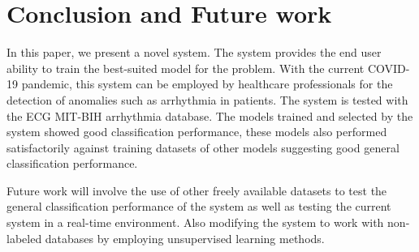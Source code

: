 \section{Conclusion and Future work} \label{sec:conclusion_and_future_work}
In this paper, we present a novel system. The system provides the end user ability to train the best-suited model for the problem. With the current COVID-19 pandemic, this system can be employed by healthcare professionals for the detection of anomalies such as arrhythmia in patients. The system is tested with the ECG MIT-BIH arrhythmia database. The models trained and selected by the system showed good classification performance, these models also performed satisfactorily against training datasets of other models suggesting good general classification performance.

Future work will involve the use of other freely available datasets to test the general classification performance of the system as well as testing the current system in a real-time environment. Also modifying the system to work with non-labeled databases by employing unsupervised learning methods.
